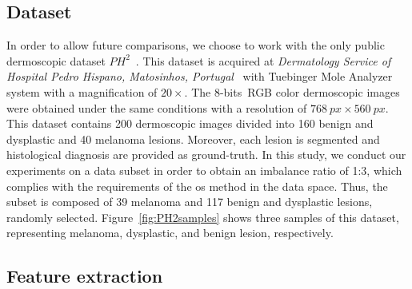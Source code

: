 \subsection{Dataset}\label{sec:dataset}
In order to allow future comparisons, we choose to work with the only public dermoscopic dataset $PH^{2}$~\cite{barata2013two}.
This dataset is acquired at \textit{Dermatology Service of Hospital Pedro Hispano, Matosinhos, Portugal}~\cite{barata2013two} with Tuebinger Mole Analyzer system with a magnification of $20 \times$.
The 8-bits~RGB color dermoscopic images were obtained under the same conditions with a resolution of $\SI{768}{px} \times \SI{560}{px}$. 
This dataset contains 200 dermoscopic images divided into 160 benign and dysplastic and 40 melanoma lesions. 
Moreover, each lesion is segmented and histological diagnosis are provided as ground-truth. 
In this study, we conduct our experiments on a data subset in order to obtain an imbalance ratio of 1:3, which complies with the requirements of the \ac{os} method in the data space.
Thus, the subset is composed of 39 melanoma and 117 benign and dysplastic lesions, randomly selected. 
Figure~\ref{fig:PH2samples} shows three samples of this dataset, representing melanoma, dysplastic, and benign lesion, respectively. 



\subsection{Feature extraction}\label{sec:feat}

